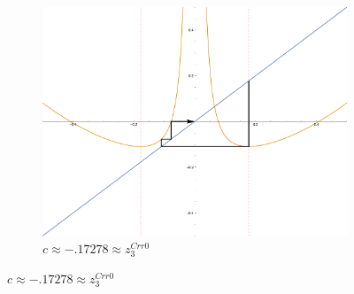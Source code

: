 \begin{figure}[ht]
\begin{subfigure}[b]{0.3\textwidth}
				\includegraphics[width=\textwidth]{./img/plot-017278}
				\caption{$c \approx -.17278 \approx z_3^{Crr0}$}
		\end{subfigure}


\end{figure}
